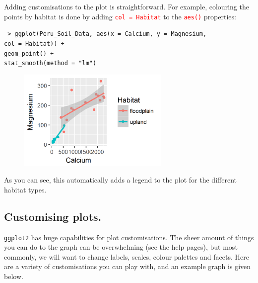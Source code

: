 \documentclass[a4paper,12pt]{article}
\newcommand\code[1]{\textcolor{red}{\texttt{#1}}}
\begin{document}
Adding customisations to the plot is straightforward. For example, colouring the points by habitat is done by adding \code{col = Habitat} to the \code{aes()} properties:

\begin{shaded}
\texttt{ > ggplot(Peru\_Soil\_Data, aes(x = Calcium, y = Magnesium, \\
\hspace*{1cm} col = Habitat)) + \\
\hspace*{1cm} geom\_point() + \\
\hspace*{1cm} stat\_smooth(method = "lm")}
\end{shaded}

\begin{figure}[h]
	\centering
	\includegraphics[width=0.65\textwidth]{figs/fig3.png}
	\label{fig:fig3}
\end{figure}

As you can see, this automatically adds a legend to the plot for the different habitat types.

\subsection{Customising plots.}

\texttt{ggplot2} has huge capabilities for plot customisations. The sheer amount of things you can do to the graph can be overwhelming (see the help pages), but most commonly, we will want to change labels, scales, colour palettes and facets. Here are a variety of customisations you can play with, and an example graph is given below.
\clearpage
\end{document}
